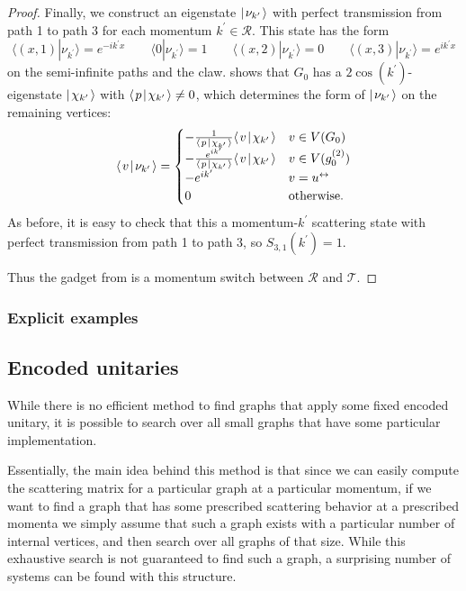 \documentclass[../thesis-main/thesis-main]{subfiles}
\begin{document}
\begin{proof}
Finally, we construct an eigenstate $|\mspace{2mu} \nu_{k^\prime} \mspace{2mu} \rangle$ with perfect transmission from path 1 to path 3 for each momentum $k^\prime \in \mathcal{R}$.  This state has the form
\[
  \langle (x,1)|\nu_{k^\prime}\rangle=e^{-i k^\prime x} \qquad 
  \langle 0|\nu_{k^\prime}\rangle=1 \qquad 
  \langle (x,2)|\nu_{k^\prime}\rangle=0 \qquad
  \langle (x,3)|\nu_{k^\prime}\rangle=e^{i k^\prime x}
\]
on the semi-infinite paths and the claw.   shows that $G_0$ has a $2\cos(k^\prime)$-eigenstate $|\mspace{2mu} \chi_{k^\prime} \mspace{2mu} \rangle$ with $\langle\mspace{2mu} p \mspace{2mu} | \mspace{2mu} \chi_{k'}\mspace{2mu} \rangle \ne 0$, which determines the form of $|\mspace{2mu} \nu_{k^\prime} \mspace{2mu} \rangle$ on the remaining vertices:
\[
  \langle\mspace{2mu} v \mspace{2mu} | \mspace{2mu} \nu_{k^\prime}\mspace{2mu} \rangle =
  \begin{cases}
	  -\frac{1}{\langle\mspace{2mu} p \mspace{2mu} | \mspace{2mu} \chi_{k'}\mspace{2mu} \rangle} \langle\mspace{2mu} v \mspace{2mu} | \mspace{2mu} \chi_{k^\prime}\mspace{2mu} \rangle & v \in V(G_0) \\
	  -\frac{e^{ik'}}{\langle\mspace{2mu} p \mspace{2mu} | \mspace{2mu} \chi_{k'}\mspace{2mu} \rangle} \langle\mspace{2mu} v \mspace{2mu} | \mspace{2mu} \chi_{k^\prime}\mspace{2mu} \rangle & v \in V(g_0^{(2)}) \\
	  -e^{ik'} & v=u^\leftrightarrow \\
    0 & \text{otherwise}.
  \end{cases} 
\]
As before, it is easy to check that this a momentum-$k^\prime$ scattering state with perfect transmission from path 1 to path 3, so $S_{3,1}(k^\prime)=1$.

Thus the gadget from  is a momentum switch between $\mathcal{R}$ and $\mathcal{T}$.
\end{proof}

\subsubsection{Explicit examples}





\subsection{Encoded unitaries}

While there is no efficient method to find graphs that apply some fixed encoded unitary, it is possible to search over all small graphs that have some particular implementation.


Essentially, the main idea behind this method is that since we can easily compute the scattering matrix for a particular graph at a particular momentum, if we want to find a graph that has some prescribed scattering behavior at a prescribed momenta we simply assume that such a graph exists with a particular number of internal vertices, and then search over all graphs of that size.  While this exhaustive search is not guaranteed to find such a graph, a surprising number of systems can be found with this structure.  
\end{document}
